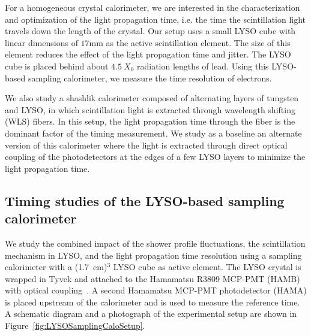 For a homogeneous crystal calorimeter, we are interested in the characterization and 
optimization of the light propagation time, i.e. the time the scintillation light travels
down the length of the crystal. Our setup uses a small LYSO cube with linear dimensions 
of $17\mathrm{mm}$ as the active scintillation element. The size of this element reduces 
the effect of the light propagation time and jitter. The LYSO cube is placed behind about 
$4.5~X_0$ radiation lengths of lead. Using this LYSO-based sampling calorimeter, we
measure the time resolution of electrons.

We also study a shashlik calorimeter composed of alternating layers of
tungsten and LYSO, in which scintillation light is extracted through wavelength
shifting (WLS) fibers. In this setup, the light propagation time through the fiber is the
dominant factor of the timing measurement. We study as a baseline an alternate version of this
calorimeter where the light is extracted through direct optical coupling of  the 
photodetectors at the edges of a few LYSO layers to minimize  the light propagation time.


\subsection{Timing studies of the LYSO-based sampling calorimeter}

We study the combined impact of the shower profile fluctuations, the
scintillation mechanism in LYSO, and the light propagation time resolution
using a sampling calorimeter with a (1.7~cm)$^{3}$ LYSO cube as active
element. The LYSO crystal is wrapped in Tyvek and attached to the Hamamatsu
R3809 MCP-PMT (HAMB) with optical coupling~\cite{grease}.   A second Hamamatsu 
MCP-PMT  photodetector (HAMA)  is placed upstream of the calorimeter and is used 
to measure the reference time. A schematic diagram and a photograph of the experimental setup
are shown in Figure~\ref{fig:LYSOSamplingCaloSetup}. 

